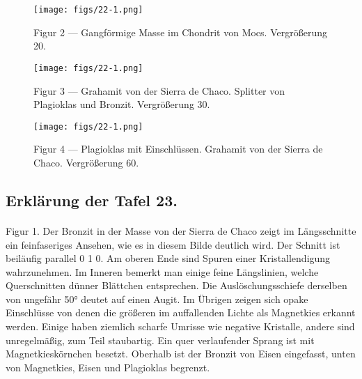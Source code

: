 \documentclass[a4paper, 11pt, oneside, polutonikogreek, german]{article}
\begin{document}
\vspace*{\fill}
\begin{figure}[H]
\centering
\texttt{[image: figs/22-1.png]}
\caption{\small Figur 2 --- Gangförmige Masse im Chondrit von Mocs. Vergrößerung 20.}
\end{figure}
\vspace*{\fill}
\clearpage

\vspace*{\fill}
\begin{figure}[H]
\centering
\texttt{[image: figs/22-1.png]}
\caption{\small Figur 3 --- Grahamit von der Sierra de Chaco. Splitter von Plagioklas und Bronzit. Vergrößerung 30.}
\end{figure}
\vspace*{\fill}
\clearpage

\vspace*{\fill}
\begin{figure}[H]
\centering
\texttt{[image: figs/22-1.png]}
\caption{\small Figur 4 --- Plagioklas mit Einschlüssen. Grahamit von der Sierra de Chaco. Vergrößerung 60.}
\end{figure}
\vspace*{\fill} 
\clearpage

\subsection{Erklärung der Tafel 23.}
\paragraph{}
Figur 1. Der Bronzit in der Masse von der Sierra de Chaco zeigt im Längsschnitte ein feinfaseriges Ansehen, wie es in diesem Bilde deutlich wird. Der Schnitt ist beiläufig parallel 0 1 0. Am oberen Ende sind Spuren einer Kristallendigung wahrzunehmen. Im Inneren bemerkt man einige feine Längslinien, welche Querschnitten dünner Blättchen entsprechen. Die Auslöschungsschiefe derselben von ungefähr 50° deutet auf einen Augit. Im Übrigen zeigen sich opake Einschlüsse von denen die größeren im auffallenden Lichte als Magnetkies erkannt werden. Einige haben ziemlich scharfe Umrisse wie negative Kristalle, andere sind unregelmäßig, zum Teil staubartig. Ein quer verlaufender Sprang ist mit Magnetkieskörnchen besetzt. Oberhalb ist der Bronzit von Eisen eingefasst, unten von Magnetkies, Eisen und Plagioklas begrenzt.
\end{document}
